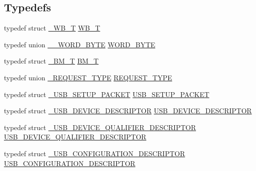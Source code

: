 \subsection*{Typedefs}
\begin{DoxyCompactItemize}
\item 
typedef struct \hyperlink{struct___w_b___t}{\+\_\+\+W\+B\+\_\+T} \hyperlink{group___u_s_b_d___core_ga4fbe30f5ac133f5bb15c653a19162ae9}{W\+B\+\_\+T}
\item 
typedef union \hyperlink{union_____w_o_r_d___b_y_t_e}{\+\_\+\+\_\+\+W\+O\+R\+D\+\_\+\+B\+Y\+TE} \hyperlink{group___u_s_b_d___core_ga340ec8de2973608b96d5cc7379b9561a}{W\+O\+R\+D\+\_\+\+B\+Y\+TE}
\item 
typedef struct \hyperlink{struct___b_m___t}{\+\_\+\+B\+M\+\_\+T} \hyperlink{group___u_s_b_d___core_ga0c191764322e096fa81c1228eb62e63f}{B\+M\+\_\+T}
\item 
typedef union \hyperlink{union___r_e_q_u_e_s_t___t_y_p_e}{\+\_\+\+R\+E\+Q\+U\+E\+S\+T\+\_\+\+T\+Y\+PE} \hyperlink{group___u_s_b_d___core_gac85164494feb72445fab7999a3723b6f}{R\+E\+Q\+U\+E\+S\+T\+\_\+\+T\+Y\+PE}
\item 
typedef struct \hyperlink{struct___u_s_b___s_e_t_u_p___p_a_c_k_e_t}{\+\_\+\+U\+S\+B\+\_\+\+S\+E\+T\+U\+P\+\_\+\+P\+A\+C\+K\+ET} \hyperlink{group___u_s_b_d___core_ga4a940f7627cc7e9f0bb693cc0fce8637}{U\+S\+B\+\_\+\+S\+E\+T\+U\+P\+\_\+\+P\+A\+C\+K\+ET}
\item 
typedef struct \hyperlink{struct___u_s_b___d_e_v_i_c_e___d_e_s_c_r_i_p_t_o_r}{\+\_\+\+U\+S\+B\+\_\+\+D\+E\+V\+I\+C\+E\+\_\+\+D\+E\+S\+C\+R\+I\+P\+T\+OR} \hyperlink{group___u_s_b_d___core_ga7c2da119cc5c129d253d5fa766c70893}{U\+S\+B\+\_\+\+D\+E\+V\+I\+C\+E\+\_\+\+D\+E\+S\+C\+R\+I\+P\+T\+OR}
\item 
typedef struct \hyperlink{struct___u_s_b___d_e_v_i_c_e___q_u_a_l_i_f_i_e_r___d_e_s_c_r_i_p_t_o_r}{\+\_\+\+U\+S\+B\+\_\+\+D\+E\+V\+I\+C\+E\+\_\+\+Q\+U\+A\+L\+I\+F\+I\+E\+R\+\_\+\+D\+E\+S\+C\+R\+I\+P\+T\+OR} \hyperlink{group___u_s_b_d___core_ga4460a327f0c59c1d44e550efcff1eb00}{U\+S\+B\+\_\+\+D\+E\+V\+I\+C\+E\+\_\+\+Q\+U\+A\+L\+I\+F\+I\+E\+R\+\_\+\+D\+E\+S\+C\+R\+I\+P\+T\+OR}
\item 
typedef struct \hyperlink{struct___u_s_b___c_o_n_f_i_g_u_r_a_t_i_o_n___d_e_s_c_r_i_p_t_o_r}{\+\_\+\+U\+S\+B\+\_\+\+C\+O\+N\+F\+I\+G\+U\+R\+A\+T\+I\+O\+N\+\_\+\+D\+E\+S\+C\+R\+I\+P\+T\+OR} \hyperlink{group___u_s_b_d___core_ga196f799666c475a9064909c6e72b9d72}{U\+S\+B\+\_\+\+C\+O\+N\+F\+I\+G\+U\+R\+A\+T\+I\+O\+N\+\_\+\+D\+E\+S\+C\+R\+I\+P\+T\+OR}
\item 

\end{DoxyCompactItemize}
